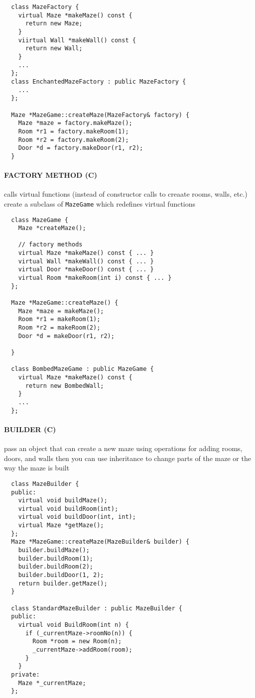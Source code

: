 \documentclass{memo}
\begin{document}
{\scriptsize
\begin{verbatim}
  class MazeFactory {
    virtual Maze *makeMaze() const { 
      return new Maze;
    }
    viirtual Wall *makeWall() const {
      return new Wall;
    }
    ... 
  };
  class EnchantedMazeFactory : public MazeFactory {
    ...
  };

  Maze *MazeGame::createMaze(MazeFactory& factory) {
    Maze *maze = factory.makeMaze();
    Room *r1 = factory.makeRoom(1);
    Room *r2 = factory.makeRoom(2);
    Door *d = factory.makeDoor(r1, r2);
  }
\end{verbatim}
}
\eit

\paragraph{FACTORY METHOD (C)}
\bit
{} calls virtual functions (instead of constructor calls to
creaate rooms, walls, etc.)
\w create a subclass of {\tt MazeGame\/} which redefines virtual functions
{\scriptsize
\begin{verbatim}
  class MazeGame {
    Maze *createMaze();
   
    // factory methods
    virtual Maze *makeMaze() const { ... }
    virtual Wall *makeWall() const { ... }
    virtual Door *makeDoor() const { ... }
    virtual Room *makeRoom(int i) const { ... }
  };

  Maze *MazeGame::createMaze() {
    Maze *maze = makeMaze();
    Room *r1 = makeRoom(1);
    Room *r2 = makeRoom(2);
    Door *d = makeDoor(r1, r2);

  }

  class BombedMazeGame : public MazeGame {
    virtual Maze *makeMaze() const {
      return new BombedWall; 
    }
    ...
  };
\end{verbatim}
}
\eit

\paragraph{BUILDER (C)}
\bit
\w pass an object that can create a new maze  using
operations for adding rooms, doors, and walls
\w then you can use inheritance to change parts of the maze or the way the
maze is built
{\scriptsize
\begin{verbatim}  
  class MazeBuilder {
  public: 
    virtual void buildMaze();
    virtual void buildRoom(int);
    virtual void buildDoor(int, int);
    virtual Maze *getMaze();
  }; 
  Maze *MazeGame::createMaze(MazeBuilder& builder) {
    builder.buildMaze();
    builder.buildRoom(1);
    builder.buildRoom(2);
    builder.buildDoor(1, 2);
    return builder.getMaze();
  }

  class StandardMazeBuilder : public MazeBuilder {
  public:
    virtual void BuildRoom(int n) {
      if (_currentMaze->roomNo(n)) {
        Room *room = new Room(n);
        _currentMaze->addRoom(room);
      }
    }
  private:
    Maze *_currentMaze;
  };
\end{verbatim}
}
\eit
\end{document}
